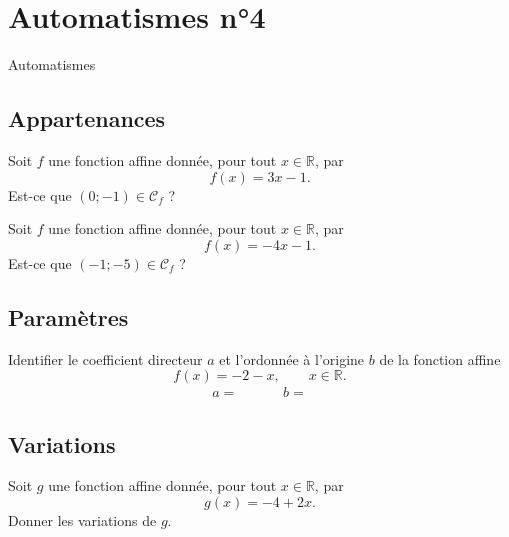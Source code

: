 \documentclass[14pt]{beamer}
\newcommand{\R}{\mathbb{R}}
\begin{document}
\section{Automatismes n°4}

\begin{frame}

\centering \huge
Automatismes

\end{frame}

\subsection{Appartenances}

\begin{frame}{1}

	Soit $f$ une fonction affine donnée, pour tout $x\in\R$, par
		\[ f(x) = 3x - 1. \]
	Est-ce que $(0;-1) \in \mathcal{C}_f$ ?
\end{frame}


\begin{frame}{2}
	Soit $f$ une fonction affine donnée, pour tout $x\in\R$, par
		\[ f(x) = -4x - 1. \]
	Est-ce que $(-1;-5) \in \mathcal{C}_f$ ?
\end{frame}

\subsection{Paramètres}

\begin{frame}{3}
    Identifier le coefficient directeur $a$ et l'ordonnée à l'origine $b$ de la fonction affine
		\[ f(x) = -2-x, \qquad x \in \R. \]
    \begin{align*}
        a = && && b=
    \end{align*}
\end{frame}

\subsection{Variations}

\begin{frame}{4}

	Soit $g$ une fonction affine donnée, pour tout $x\in\R$, par
		\[ g(x) = -4 + 2x. \]
	Donner les variations de $g$.

\end{frame}
\end{document}
